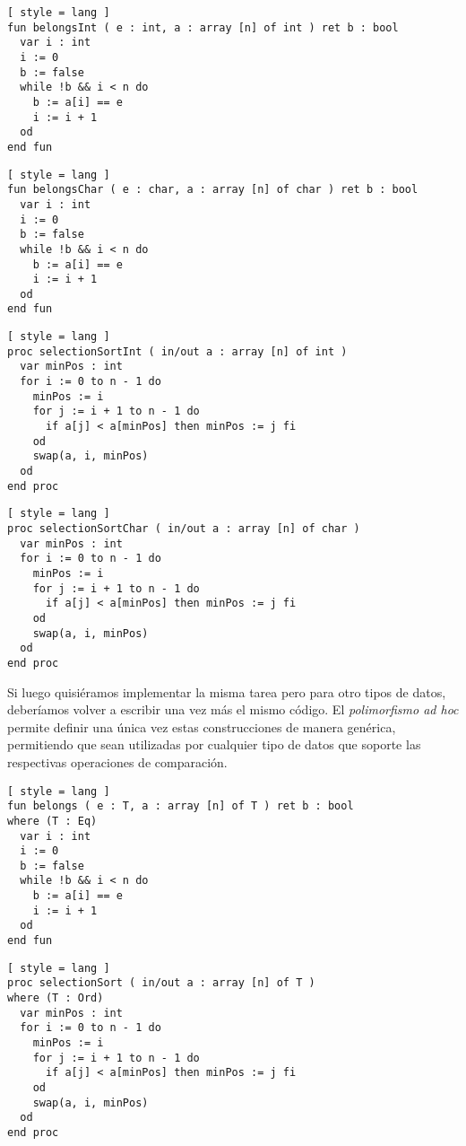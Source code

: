 \begin{lstlisting}[ style = lang ]
fun belongsInt ( e : int, a : array [n] of int ) ret b : bool
  var i : int
  i := 0
  b := false
  while !b && i < n do
    b := a[i] == e
    i := i + 1
  od
end fun
\end{lstlisting}

\begin{lstlisting}[ style = lang ]
fun belongsChar ( e : char, a : array [n] of char ) ret b : bool
  var i : int
  i := 0
  b := false
  while !b && i < n do
    b := a[i] == e
    i := i + 1
  od
end fun
\end{lstlisting}

\begin{lstlisting}[ style = lang ]
proc selectionSortInt ( in/out a : array [n] of int )
  var minPos : int
  for i := 0 to n - 1 do
    minPos := i
    for j := i + 1 to n - 1 do
      if a[j] < a[minPos] then minPos := j fi
    od
    swap(a, i, minPos)
  od
end proc
\end{lstlisting}

\begin{lstlisting}[ style = lang ]
proc selectionSortChar ( in/out a : array [n] of char )
  var minPos : int
  for i := 0 to n - 1 do
    minPos := i
    for j := i + 1 to n - 1 do
      if a[j] < a[minPos] then minPos := j fi
    od
    swap(a, i, minPos)
  od
end proc
\end{lstlisting}

Si luego quisiéramos implementar la misma tarea pero para otro tipos de datos, deberíamos volver a escribir una vez más el mismo código.
El \textit{polimorfismo ad hoc} permite definir una única vez estas construcciones de manera genérica, permitiendo que sean utilizadas por cualquier tipo de datos que soporte las respectivas operaciones de comparación.

\begin{lstlisting}[ style = lang ]
fun belongs ( e : T, a : array [n] of T ) ret b : bool
where (T : Eq)
  var i : int
  i := 0
  b := false
  while !b && i < n do
    b := a[i] == e
    i := i + 1
  od
end fun
\end{lstlisting}

\begin{lstlisting}[ style = lang ]
proc selectionSort ( in/out a : array [n] of T )
where (T : Ord)
  var minPos : int
  for i := 0 to n - 1 do
    minPos := i
    for j := i + 1 to n - 1 do
      if a[j] < a[minPos] then minPos := j fi
    od
    swap(a, i, minPos)
  od
end proc
\end{lstlisting}

